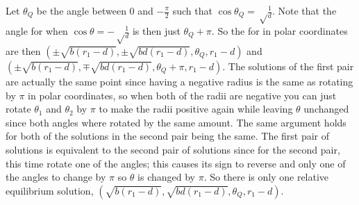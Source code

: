 {Let $\theta_Q$ be the angle between $0$ and $-\frac{\pi}{2}$ such that $\cos \theta_Q = \sqrt \frac{1}{d}$. Note that the angle for when $\cos \theta = - \sqrt \frac{1}{d}$ is then just $\theta_Q +\pi$.
So the \reqva for \cLe in polar coordinates are then $\left(\pm \sqrt{b \left(r_1 -d\right)},\pm \sqrt{b d \left(r_1 -d\right)},\theta_Q, r_1 -d\right)$ and $\left(\pm \sqrt{b \left(r_1 -d\right)},\mp \sqrt{b d \left(r_1 -d\right)},\theta_Q +\pi, r_1 -d \right)$. The solutions of the first pair are actually the same point since having a negative radius is the same as rotating by $\pi$ in polar coordinates, so when both of the radii are negative you can just rotate $\theta_1$ and $\theta_2$ by $\pi$ to make the radii positive again while leaving $\theta$ unchanged since both angles where rotated by the same amount. The same argument holds for both of the solutions in the second pair being the same. The first pair of solutions is equivalent to the second pair of solutions since for the second pair, this time rotate one of the angles; this causes its sign to reverse and only one of the angles to change by $\pi$ so $\theta$ is changed by $\pi$. So there is only one relative equilibrium solution, $\left(\sqrt{b \left(r_1 -d\right)},\sqrt{b d \left(r_1 -d\right)},\theta_Q, r_1 -d\right)$.


}
